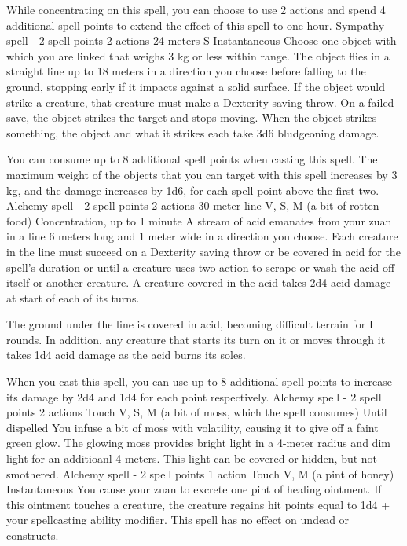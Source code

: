     While concentrating on this spell, you can choose to use 2 actions and spend 4 additional spell points to extend the effect of this spell to one hour.
    {Sympathy spell - 2 spell points}
    {2 actions}
    {24 meters}
    {S}
    {Instantaneous}
    Choose one object with which you are linked that weighs 3 kg or less within range.
    The object flies in a straight line up to 18 meters in a direction you choose before falling to the ground, stopping early if it impacts against a solid surface.
    If the object would strike a creature, that creature must make a Dexterity saving throw.
    On a failed save, the object strikes the target and stops moving.
    When the object strikes something, the object and what it strikes each take 3d6 bludgeoning damage.

    You can consume up to 8 additional spell points when casting this spell.
    The maximum weight of the objects that you can target with this spell increases by 3 kg, and the damage increases by 1d6, for each spell point above the first two.
    {Alchemy spell - 2 spell points}
    {2 actions}
    {30-meter line}
    {V, S, M (a bit of rotten food)}
    {Concentration, up to 1 minute}
    A stream of acid emanates from your zuan in a line 6 meters long and 1 meter wide in a direction you choose.
    Each creature in the line must succeed on a Dexterity saving throw or be covered in acid for the spell's duration or until a creature uses two action to scrape or wash the acid off itself or another creature.
    A creature covered in the acid takes 2d4 acid damage at start of each of its turns.

    The ground under the line is covered in acid, becoming difficult terrain for I rounds.
    In addition, any creature that starts its turn on it or moves through it takes 1d4 acid damage as the acid burns its soles.

    When you cast this spell, you can use up to 8 additional spell points to increase its damage by 2d4 and 1d4 for each point respectively.
    {Alchemy spell - 2 spell points}
    {2 actions}
    {Touch}
    {V, S, M (a bit of moss, which the spell consumes)}
    {Until dispelled}
    You infuse a bit of moss with volatility, causing it to give off a faint green glow.
    The glowing moss provides bright light in a 4-meter radius and dim light for an additioanl 4 meters.
    This light can be covered or hidden, but not smothered.
    {Alchemy spell - 2 spell points}
    {1 action}
    {Touch}
    {V, M (a pint of honey)}
    {Instantaneous}
    You cause your zuan to excrete one pint of healing ointment.
    If this ointment touches a creature, the creature regains hit points equal to 1d4 + your spellcasting ability modifier.
    This spell has no effect on undead or constructs.

